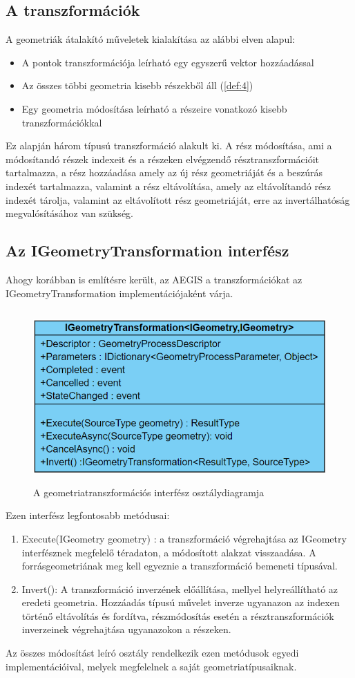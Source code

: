 \subsection{A transzformációk}
A geometriák átalakító műveletek kialakítása az alábbi elven alapul:
\begin{itemize}
	\item A pontok transzformációja leírható egy egyszerű vektor hozzáadással
	\item Az összes többi geometria kisebb részekből áll (\ref{def:4})
	\item Egy geometria módosítása leírható a részeire vonatkozó kisebb transzformációkkal
\end{itemize}
Ez alapján három típusú transzformáció alakult ki. A rész módosítása, ami a módosítandó részek indexeit és a részeken elvégzendő résztranszformációit tartalmazza, a rész hozzáadása amely az új rész geometriáját és a beszúrás indexét tartalmazza, valamint a rész eltávolítása, amely az eltávolítandó rész indexét tárolja, valamint az eltávolított rész geometriáját, erre az invertálhatóság megvalósításához van szükség.
\subsection{Az IGeometryTransformation interfész}
Ahogy korábban is említésre került, az AEGIS a transzformációkat az IGeometryTransformation implementációjaként várja. 
\begin{figure}[H]
	\centering
	\includegraphics[width=\textwidth,height=250px]{images/GeomTransformIface.png}
	\caption{A geometriatranszformációs interfész osztálydiagramja}
	\label{fig:picture-5}
\end{figure}
Ezen interfész legfontosabb metódusai:
\begin{enumerate}
	\item Execute(IGeometry geometry) : a transzformáció végrehajtása az IGeometry interfésznek megfelelő téradaton, a módosított alakzat visszaadása. A forrásgeometriának meg kell egyeznie a transzformáció bemeneti típusával.
	\item Invert(): A transzformáció inverzének előállítása, mellyel helyreállítható az eredeti geometria. Hozzáadás típusú művelet inverze ugyanazon az indexen történő eltávolítás és fordítva, részmódosítás esetén a résztranszformációk inverzeinek végrehajtása ugyanazokon a részeken.
\end{enumerate}
Az összes módosítást leíró osztály rendelkezik ezen metódusok egyedi implementációival, melyek megfelelnek a saját geometriatípusaiknak.
